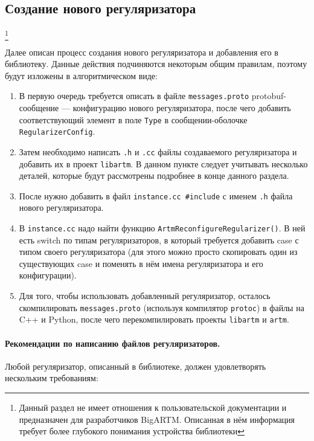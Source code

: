 \subsection{Создание нового регуляризатора}
\footnote{Данный раздел не имеет отношения к пользовательской документации и предназначен для разработчиков BigARTM. Описанная в нём информация требует более глубокого понимания устройства библиотеки}

Далее описан процесс создания нового регуляризатора и добавления его в библиотеку. Данные действия подчиняются некоторым общим правилам, поэтому будут изложены в алгоритмическом виде:

\begin{enumerate}
	\item В первую очередь требуется описать в файле \verb'messages.proto' protobuf-сообщение ---  конфигурацию нового регуляризатора, после чего добавить соответствующий элемент в поле \verb'Type' в сообщении-оболочке \verb'RegularizerConfig'.
	
	\item Затем необходимо написать \verb'.h' и \verb'.cc' файлы создаваемого регуляризатора и добавить их в проект \verb'libartm'. В данном пункте следует учитывать несколько деталей, которые будут рассмотрены подробнее в конце данного раздела.
	
	\item После нужно добавить в файл \verb'instance.cc #include' с именем \verb'.h' файла нового регуляризатора.
	
	\item В  \verb'instance.cc' надо найти функцию \verb'ArtmReconfigureRegularizer()'. В ней есть switch по типам регуляризаторов, в который требуется добавить case с типом своего регуляризатора (для этого можно просто скопировать один из существующих case и поменять в нём имена регуляризатора и его конфигурации).
	
	\item Для того, чтобы использовать добавленный регуляризатор, осталось скомпилировать \verb'messages.proto' (используя компилятор \verb'protoc') в файлы на C++ и Python, после чего перекомпилировать проекты \verb'libartm' и \verb'artm'.
\end{enumerate}

\paragraph{Рекомендации по написанию файлов регуляризаторов.} Любой регуляризатор, описанный в библиотеке, должен удовлетворять нескольким требованиям:


